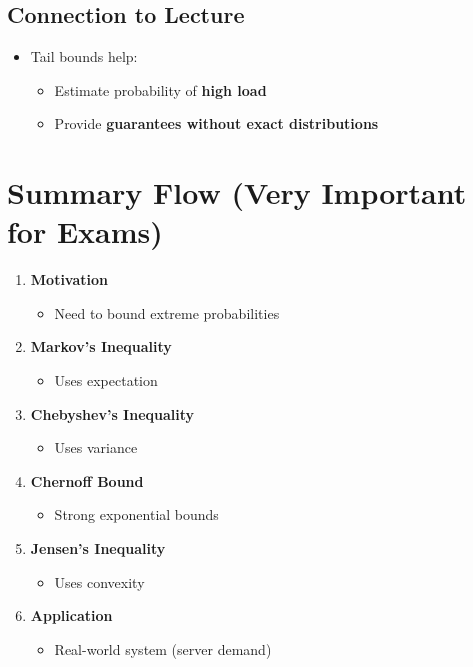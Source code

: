 \documentclass[12pt]{article}
\begin{document}
\subsection*{Connection to Lecture}

\begin{itemize}
    \item Tail bounds help:
    \begin{itemize}
        \item Estimate probability of \textbf{high load}
        \item Provide \textbf{guarantees without exact distributions}
    \end{itemize}
\end{itemize}

\section*{Summary Flow (Very Important for Exams)}

\begin{enumerate}
    \item \textbf{Motivation}
    \begin{itemize}
        \item Need to bound extreme probabilities
    \end{itemize}
    \item \textbf{Markov’s Inequality}
    \begin{itemize}
        \item Uses expectation
    \end{itemize}
    \item \textbf{Chebyshev’s Inequality}
    \begin{itemize}
        \item Uses variance
    \end{itemize}
    \item \textbf{Chernoff Bound}
    \begin{itemize}
        \item Strong exponential bounds
    \end{itemize}
    \item \textbf{Jensen’s Inequality}
    \begin{itemize}
        \item Uses convexity
    \end{itemize}
    \item \textbf{Application}
    \begin{itemize}
        \item Real-world system (server demand)
    \end{itemize}
\end{enumerate}
\end{document}
